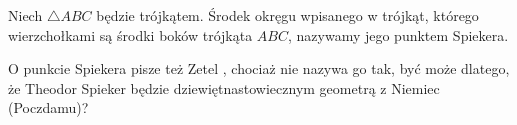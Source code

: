 %

\begin{proposition}
\label{punkt_spiekera}%
    Niech $\triangle ABC$ będzie trójkątem.
    Środek okręgu wpisanego w trójkąt, którego wierzchołkami są środki boków trójkąta $ABC$, nazywamy jego punktem Spiekera.    
\end{proposition}

O punkcie Spiekera pisze też Zetel \cite[s. 22]{zetel_2020}, chociaż nie nazywa go tak, być może dlatego, że Theodor Spieker będzie dziewiętnastowiecznym geometrą z Niemiec (Poczdamu)?

%